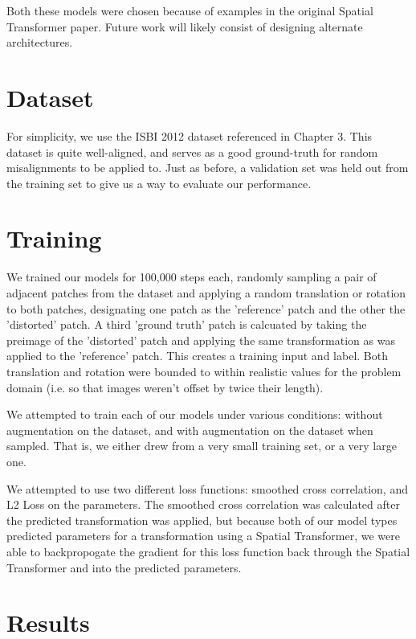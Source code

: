 Both these models were chosen because of examples in the original Spatial Transformer paper. Future work will likely consist of designing alternate architectures.


\section{Dataset}

For simplicity, we use the ISBI 2012 dataset referenced in Chapter 3. This dataset is quite well-aligned, and serves as a good ground-truth for random misalignments to be applied to. Just as before, a validation set was held out from the training set to give us a way to evaluate our performance.

\section{Training}

We trained our models for 100,000 steps each, randomly sampling a pair of adjacent patches from the dataset and applying a random translation or rotation to both patches, designating one patch as the 'reference' patch and the other the 'distorted' patch. A third 'ground truth' patch is calcuated by taking the preimage of the 'distorted' patch and applying the same transformation as was applied to the 'reference' patch. This creates a training input and label. Both translation and rotation were bounded to within realistic values for the problem domain (i.e. so that images weren't offset by twice their length).

We attempted to train each of our models under various conditions: without augmentation on the dataset, and with augmentation on the dataset when sampled. That is, we either drew from a very small training set, or a very large one. 

We attempted to use two different loss functions: smoothed cross correlation, and L2 Loss on the parameters. The smoothed cross correlation was calculated after the predicted transformation was applied, but because both of our model types predicted parameters for a transformation using a Spatial Transformer, we were able to backpropogate the gradient for this loss function back through the Spatial Transformer and into the predicted parameters.

\section{Results}

